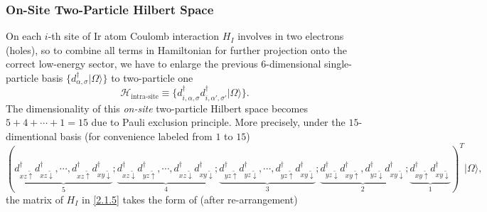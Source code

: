 \documentclass[10pt,nofootinbib]{revtex4}
\begin{document}
		\subsubsection{On-Site Two-Particle Hilbert Space}
			On each $i$-th site of Ir atom Coulomb interaction $H_I$ involves in two electrons (holes), so to combine all terms in Hamiltonian for further projection onto the correct low-energy sector, we have to enlarge the previous $6$-dimensional single-particle basis $\{d^\dagger_{\alpha,\sigma}|\Omega\rangle\}$ to two-particle one
			\begin{equation}\label{2.1.6}
				\mathcal{H}_{\text{intra-site}}\equiv \{d^\dagger_{i,\alpha,\sigma}d^\dagger_{i,\alpha',\sigma'}|\Omega\rangle\}.
			\end{equation}
			The dimensionality of this \emph{on-site} two-particle Hilbert space becomes $5+4+\cdots+1=15$ due to Pauli exclusion principle. More precisely, under the $15$-dimentional basis (for convenience labeled from $1$ to $15$)
			\begin{equation*}
				(\underbrace{d_{xz \widetilde{\uparrow} }^\dagger d_{xz \widetilde{\downarrow} }^\dagger,\cdots, d_{xz \widetilde{\uparrow} }^\dagger d_{xy \widetilde{\downarrow} }^\dagger}_{\text{5}};\underbrace{d_{xz \widetilde{\downarrow} }^\dagger d_{yz \widetilde{\uparrow} }^\dagger,\cdots,d_{xz \widetilde{\downarrow} }^\dagger d_{xy \widetilde{\downarrow} }^\dagger}_{\text{4}};\underbrace{d_{yz \widetilde{\uparrow} }^\dagger d_{yz \widetilde{\downarrow} }^\dagger,\cdots,d_{yz \widetilde{\uparrow} }^\dagger d_{xy \widetilde{\downarrow} }^\dagger}_{\text{3}};\underbrace{d_{yz \widetilde{\downarrow} }^\dagger d_{xy \widetilde{\uparrow} }^\dagger,d_{yz \widetilde{\downarrow} }^\dagger d_{xy \widetilde{\downarrow} }^\dagger}_{\text{2}};\underbrace{d_{xy \widetilde{\uparrow} }^\dagger d_{xy \widetilde{\downarrow} }^\dagger}_{\text{1}})^T|\Omega\rangle,
			\end{equation*}
			the matrix of $H_I$ in \eqref{2.1.5} takes the form of (after re-arrangement)
\end{document}
